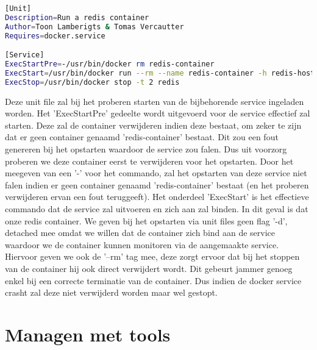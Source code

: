 
\begin{lstlisting}[language=bash, style=configstyle]
[Unit]
Description=Run a redis container
Author=Toon Lamberigts & Tomas Vercautter
Requires=docker.service

[Service]
ExecStartPre=-/usr/bin/docker rm redis-container
ExecStart=/usr/bin/docker run --rm --name redis-container -h redis-host redis
ExecStop=/usr/bin/docker stop -t 2 redis
\end{lstlisting}

Deze unit file zal bij het proberen starten van de bijbehorende service ingeladen worden. Het 'ExecStartPre' gedeelte wordt uitgevoerd voor de service effectief zal starten. Deze zal de container verwijderen indien deze bestaat, om zeker te zijn dat er geen container genaamd 'redis-container' bestaat. Dit zou een fout genereren bij het opstarten waardoor de service zou falen. Dus uit voorzorg proberen we deze container eerst te verwijderen voor het opstarten. Door het meegeven van een '-' voor het commando, zal het opstarten van deze service niet falen indien er geen container genaamd 'redis-container' bestaat (en het proberen verwijderen ervan een fout teruggeeft). Het onderdeel 'ExecStart' is het effectieve commando dat de service zal uitvoeren en zich aan zal binden. In dit geval is dat onze redis container. We geven bij het opstarten via unit files geen flag '-d', detached mee omdat we willen dat de container zich bind aan de service waardoor we de container kunnen monitoren via de aangemaakte service. Hiervoor geven we ook de '--rm' tag mee, deze zorgt ervoor dat bij het stoppen van de container hij ook direct verwijdert wordt. Dit gebeurt jammer genoeg enkel bij een correcte terminatie van de container. Dus indien de docker service crasht zal deze niet verwijderd worden maar wel gestopt.

\section{Managen met tools}

